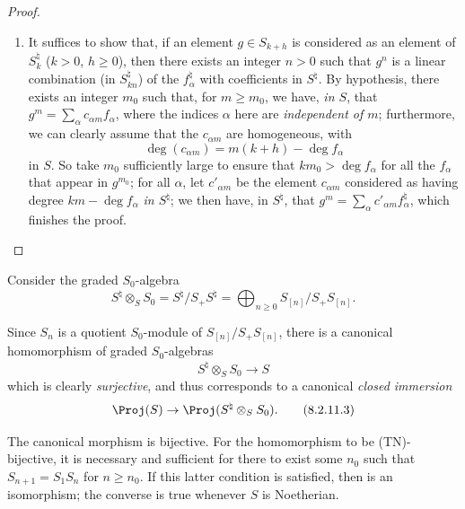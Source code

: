 \begin{proof}
\begin{enumerate}
    the equality $S_n^\natural=S_1^{\natural n}$ thus implies that $S_n=S_1^n$.
  \item[\rm{(iv)}] It suffices to show that, if an element $g\in S_{k+h}$ is considered as an element of $S_k^\natural$ ($k>0$, $h\geq0$), then there exists an integer $n>0$ such that $g^n$ is a linear combination (in $S_{kn}^\natural$) of the $f_\alpha^\natural$ with coefficients in $S^\natural$.
    By hypothesis, there exists an integer $m_0$ such that, for $m\geq m_0$, we have, \emph{in $S$}, that $g^m = \sum_\alpha c_{\alpha m}f_\alpha$, where the indices $\alpha$ here are \emph{independent of $m$};
    furthermore, we can clearly assume that the $c_{\alpha m}$ are homogeneous, with
    \[
      \deg(c_{\alpha m}) = m(k+h)-\deg f_\alpha
    \]
    in $S$.
    So take $m_0$ sufficiently large to ensure that $km_0>\deg f_\alpha$ for all the $f_\alpha$ that appear in $g^{m_0}$;
    for all $\alpha$, let $c'_{\alpha m}$ be the element $c_{\alpha m}$ considered as having degree $km-\deg f_\alpha$ \emph{in $S^\natural$};
    we then have, in $S^\natural$, that $g^m = \sum_\alpha c'_{\alpha m}f_\alpha^\natural$, which finishes the proof.
\end{enumerate}
\end{proof}

\begin{env}[8.2.11]
\label{II.8.2.11}
Consider the graded $S_0$-algebra
\[
\label{II.8.2.11.1}
  S^\natural \otimes_S S_0
  =
  S^\natural/S_+S^\natural
  =
  \bigoplus_{n\geq0} S_{[n]}/S_+S_{[n]}.
\tag{8.2.11.1}
\]

Since $S_n$ is a quotient $S_0$-module of $S_{[n]}/S_+S_{[n]}$, there is a canonical homomorphism of graded $S_0$-algebras
\[
\label{II.8.2.11.2}
  S^\natural \otimes_S S_0 \to S
\tag{8.2.11.2}
\]
which is clearly \emph{surjective}, and thus corresponds  to a canonical \emph{closed immersion}
\[
\label{II.8.2.11.3}
  \Proj(S) \to \Proj(S^\natural \otimes_S S_0).
\tag{8.2.11.3}
\]
\end{env}

\begin{proposition}[8.2.12]
\label{II.8.2.12}
The canonical morphism  is bijective.
For the homomorphism  to be (TN)-bijective, it is necessary and sufficient for there to exist some $n_0$ such that $S_{n+1}=S_1S_n$ for $n\geq n_0$.
If this latter condition is satisfied, then  is an isomorphism;
the converse is true whenever $S$ is Noetherian.
\end{proposition}

